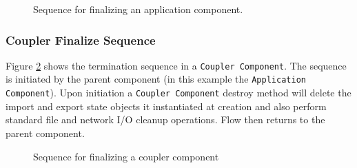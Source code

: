 \begin{figure}
\caption[{Application Finalize}]{Sequence for finalizing an application
component.\\}
\label{fig:ApplicationFinalizeSequence}
\end{figure}

\subsubsection{Coupler Finalize Sequence}
Figure \ref{fig:CouplerFinalizeSequence} shows the termination sequence in
a {\tt  Coupler Component}. The sequence is initiated by the parent 
component (in this example the {\tt Application Component}). Upon 
initiation a {\tt Coupler Component} destroy method will delete
the import and export state objects it instantiated at creation and
also perform standard file and network I/O cleanup operations.
Flow then returns to the parent component.
\begin{figure}
\caption[{Coupler Finalize}]{Sequence for finalizing a coupler component}
\label{fig:CouplerFinalizeSequence}
\end{figure}

